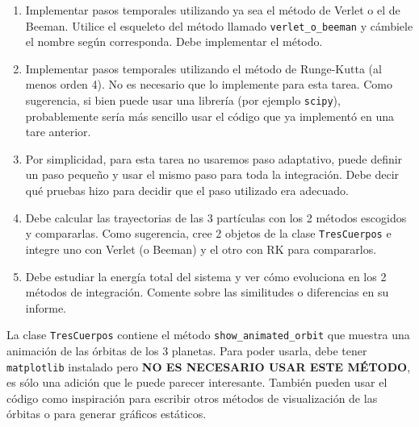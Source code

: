 \documentclass[letter, 11pt]{article}
\begin{document}
\begin{enumerate}

  \item Implementar pasos temporales utilizando ya sea el método de Verlet o el
    de Beeman. Utilice el esqueleto del método llamado
    \texttt{verlet\_o\_beeman} y cámbiele el nombre según corresponda. Debe
    implementar el método.

  \item Implementar pasos temporales utilizando el método de Runge-Kutta (al
    menos orden 4). No es necesario que lo implemente para esta tarea. Como
    sugerencia, si bien puede usar una librería (por ejemplo \texttt{scipy}),
    probablemente sería más sencillo usar el código que ya implementó en una
    tare anterior.

  \item Por simplicidad, para esta tarea no usaremos paso adaptativo, puede
    definir un paso pequeño y usar el mismo paso para toda la integración. Debe
    decir qué pruebas hizo para decidir que el paso utilizado era adecuado.

  \item Debe calcular las trayectorias de las 3 partículas con los 2 métodos
    escogidos y compararlas. Como sugerencia, cree 2 objetos de la clase
    \texttt{TresCuerpos} e integre uno con Verlet (o Beeman) y el otro con RK
    para compararlos.

  \item Debe estudiar la energía total del sistema y ver cómo evoluciona en los
    2 métodos de integración. Comente sobre las similitudes o diferencias en su
    informe.

\end{enumerate}


\begin{ayuda}
  \small

  La clase \texttt{TresCuerpos} contiene el método
  \texttt{show\_animated\_orbit} que muestra una animación de las órbitas de los
  3 planetas. Para poder usarla, debe tener \texttt{matplotlib} instalado pero
  {\bf NO ES NECESARIO USAR ESTE MÉTODO}, es sólo una adición que le puede
  parecer interesante. También pueden usar el código como inspiración para
  escribir otros métodos de visualización de las órbitas o para generar gráficos
  estáticos.

\end{ayuda}

\end{document}
